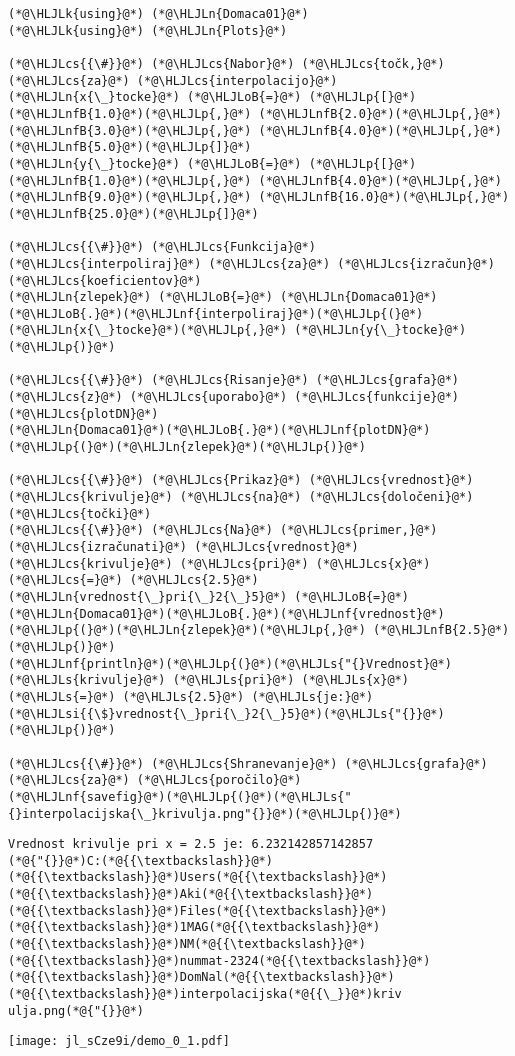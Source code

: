 \documentclass[12pt,a4paper]{article}
\newcommand{\HLJLk}[1]{\textcolor[RGB]{148,91,176}{\textbf{#1}}}
\newcommand{\HLJLn}[1]{#1}
\newcommand{\HLJLnf}[1]{\textcolor[RGB]{66,102,213}{#1}}
\newcommand{\HLJLs}[1]{\textcolor[RGB]{201,61,57}{#1}}
\newcommand{\HLJLsi}[1]{#1}
\newcommand{\HLJLnfB}[1]{\textcolor[RGB]{59,151,46}{#1}}
\newcommand{\HLJLoB}[1]{\textcolor[RGB]{102,102,102}{\textbf{#1}}}
\newcommand{\HLJLp}[1]{#1}
\newcommand{\HLJLcs}[1]{\textcolor[RGB]{153,153,119}{\textit{#1}}}
\begin{document}
\begin{lstlisting}
(*@\HLJLk{using}@*) (*@\HLJLn{Domaca01}@*)
(*@\HLJLk{using}@*) (*@\HLJLn{Plots}@*)

(*@\HLJLcs{{\#}}@*) (*@\HLJLcs{Nabor}@*) (*@\HLJLcs{točk,}@*) (*@\HLJLcs{za}@*) (*@\HLJLcs{interpolacijo}@*)
(*@\HLJLn{x{\_}tocke}@*) (*@\HLJLoB{=}@*) (*@\HLJLp{[}@*)(*@\HLJLnfB{1.0}@*)(*@\HLJLp{,}@*) (*@\HLJLnfB{2.0}@*)(*@\HLJLp{,}@*) (*@\HLJLnfB{3.0}@*)(*@\HLJLp{,}@*) (*@\HLJLnfB{4.0}@*)(*@\HLJLp{,}@*) (*@\HLJLnfB{5.0}@*)(*@\HLJLp{]}@*)
(*@\HLJLn{y{\_}tocke}@*) (*@\HLJLoB{=}@*) (*@\HLJLp{[}@*)(*@\HLJLnfB{1.0}@*)(*@\HLJLp{,}@*) (*@\HLJLnfB{4.0}@*)(*@\HLJLp{,}@*) (*@\HLJLnfB{9.0}@*)(*@\HLJLp{,}@*) (*@\HLJLnfB{16.0}@*)(*@\HLJLp{,}@*) (*@\HLJLnfB{25.0}@*)(*@\HLJLp{]}@*)

(*@\HLJLcs{{\#}}@*) (*@\HLJLcs{Funkcija}@*) (*@\HLJLcs{interpoliraj}@*) (*@\HLJLcs{za}@*) (*@\HLJLcs{izračun}@*) (*@\HLJLcs{koeficientov}@*)
(*@\HLJLn{zlepek}@*) (*@\HLJLoB{=}@*) (*@\HLJLn{Domaca01}@*)(*@\HLJLoB{.}@*)(*@\HLJLnf{interpoliraj}@*)(*@\HLJLp{(}@*)(*@\HLJLn{x{\_}tocke}@*)(*@\HLJLp{,}@*) (*@\HLJLn{y{\_}tocke}@*)(*@\HLJLp{)}@*)

(*@\HLJLcs{{\#}}@*) (*@\HLJLcs{Risanje}@*) (*@\HLJLcs{grafa}@*) (*@\HLJLcs{z}@*) (*@\HLJLcs{uporabo}@*) (*@\HLJLcs{funkcije}@*) (*@\HLJLcs{plotDN}@*)
(*@\HLJLn{Domaca01}@*)(*@\HLJLoB{.}@*)(*@\HLJLnf{plotDN}@*)(*@\HLJLp{(}@*)(*@\HLJLn{zlepek}@*)(*@\HLJLp{)}@*)

(*@\HLJLcs{{\#}}@*) (*@\HLJLcs{Prikaz}@*) (*@\HLJLcs{vrednost}@*) (*@\HLJLcs{krivulje}@*) (*@\HLJLcs{na}@*) (*@\HLJLcs{določeni}@*) (*@\HLJLcs{točki}@*)
(*@\HLJLcs{{\#}}@*) (*@\HLJLcs{Na}@*) (*@\HLJLcs{primer,}@*) (*@\HLJLcs{izračunati}@*) (*@\HLJLcs{vrednost}@*) (*@\HLJLcs{krivulje}@*) (*@\HLJLcs{pri}@*) (*@\HLJLcs{x}@*) (*@\HLJLcs{=}@*) (*@\HLJLcs{2.5}@*)
(*@\HLJLn{vrednost{\_}pri{\_}2{\_}5}@*) (*@\HLJLoB{=}@*) (*@\HLJLn{Domaca01}@*)(*@\HLJLoB{.}@*)(*@\HLJLnf{vrednost}@*)(*@\HLJLp{(}@*)(*@\HLJLn{zlepek}@*)(*@\HLJLp{,}@*) (*@\HLJLnfB{2.5}@*)(*@\HLJLp{)}@*)
(*@\HLJLnf{println}@*)(*@\HLJLp{(}@*)(*@\HLJLs{"{}Vrednost}@*) (*@\HLJLs{krivulje}@*) (*@\HLJLs{pri}@*) (*@\HLJLs{x}@*) (*@\HLJLs{=}@*) (*@\HLJLs{2.5}@*) (*@\HLJLs{je:}@*) (*@\HLJLsi{{\$}vrednost{\_}pri{\_}2{\_}5}@*)(*@\HLJLs{"{}}@*)(*@\HLJLp{)}@*)

(*@\HLJLcs{{\#}}@*) (*@\HLJLcs{Shranevanje}@*) (*@\HLJLcs{grafa}@*) (*@\HLJLcs{za}@*) (*@\HLJLcs{poročilo}@*)
(*@\HLJLnf{savefig}@*)(*@\HLJLp{(}@*)(*@\HLJLs{"{}interpolacijska{\_}krivulja.png"{}}@*)(*@\HLJLp{)}@*)
\end{lstlisting}

\begin{lstlisting}
Vrednost krivulje pri x = 2.5 je: 6.232142857142857
(*@{"{}}@*)C:(*@{{\textbackslash}}@*)(*@{{\textbackslash}}@*)Users(*@{{\textbackslash}}@*)(*@{{\textbackslash}}@*)Aki(*@{{\textbackslash}}@*)(*@{{\textbackslash}}@*)Files(*@{{\textbackslash}}@*)(*@{{\textbackslash}}@*)1MAG(*@{{\textbackslash}}@*)(*@{{\textbackslash}}@*)NM(*@{{\textbackslash}}@*)(*@{{\textbackslash}}@*)nummat-2324(*@{{\textbackslash}}@*)(*@{{\textbackslash}}@*)DomNal(*@{{\textbackslash}}@*)(*@{{\textbackslash}}@*)interpolacijska(*@{{\_}}@*)kriv
ulja.png(*@{"{}}@*)
\end{lstlisting}

\texttt{[image: jl\_sCze9i/demo\_0\_1.pdf]}
\end{document}

